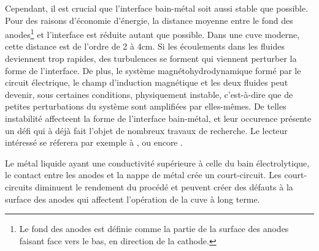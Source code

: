 Cependant, il est crucial que l'interface bain-métal soit aussi stable
que possible. Pour des raisons d'économie d'énergie, la distance
moyenne entre le fond des anodes\footnote{Le fond des anodes est
  définie comme la partie de la surface des anodes faisant face vers
le bas, en direction de la cathode.} et l'interface est réduite
autant que possible. Dans une cuve moderne, cette distance est de
l'ordre de \num{2} à \num{4}\si{\centi\meter}. Si les écoulements
dans les fluides deviennent trop rapides, des turbulences se forment qui
viennent perturber la forme de l'interface. De plus, le système
magnétohydrodynamique formé par le circuit électrique, le champ
d'induction magnétique et les deux fluides peut devenir, sous
certaines conditions, physiquement instable, c'est-à-dire que de
petites perturbations du système sont amplifiées par elles-mêmes. De
telles instabilité affecteent la forme de l'interface bain-métal, et
leur occurence présente un défi qui à déjà fait l'objet de
nombreux travaux de recherche. Le lecteur intéressé se réferera
par exemple à \cite{}, \cite{} ou encore \cite{}.

Le métal liquide ayant une conductivité supérieure à celle du
bain électrolytique, le contact entre les anodes et la nappe de
métal crée un court-circuit. Les court-circuits diminuent le rendement du
procédé et peuvent créer des défauts à la surface des anodes qui
affectent l'opération de la cuve à long terme.


